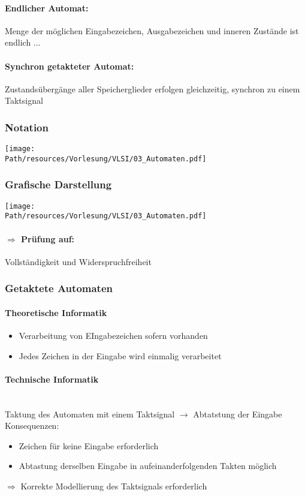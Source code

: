 	\paragraph{Endlicher Automat:} Menge der möglichen Eingabezeichen, Ausgabezeichen und inneren Zustände ist endlich ...
	\paragraph{Synchron getakteter Automat:} Zustandsübergänge aller Speicherglieder erfolgen gleichzeitig, synchron zu einem Taktsignal
	
	\subsubsection{Notation}
		\begin{center}
			\texttt{[image: \\Path/resources/Vorlesung/VLSI/03\_Automaten.pdf]}
		\end{center}
	\subsubsection{Grafische Darstellung}
		\begin{center}
			\texttt{[image: \\Path/resources/Vorlesung/VLSI/03\_Automaten.pdf]}
		\end{center}
		\paragraph{$\Rightarrow$ Prüfung auf:} Vollständigkeit und Widerspruchfreiheit
	
	\subsubsection{Getaktete Automaten}
		\paragraph{Theoretische Informatik}
		\begin{itemize}
			\item Verarbeitung von EIngabezeichen sofern vorhanden
			\item Jedes Zeichen in der Eingabe wird einmalig verarbeitet
		\end{itemize} 
		\paragraph{Technische Informatik}\hfill\\
		Taktung des Automaten mit einem Taktsignal $\rightarrow$ Abtatstung der Eingabe\\
		Konsequenzen:
		\begin{itemize}
			\item Zeichen für \grqq keine Eingabe \grqq erforderlich
			\item Abtastung \grqq derselben Eingabe \grqq in aufeinanderfolgenden Takten möglich
		\end{itemize} 
		$\Rightarrow$ Korrekte Modellierung des Taktsignals erforderlich
	
